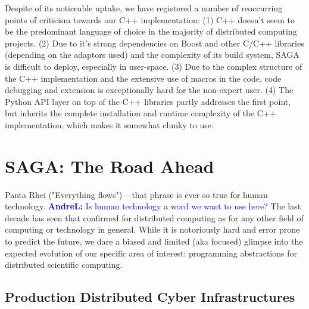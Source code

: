 \documentclass[]{article}
\newcommand{\B}[1]{\textbf{#1}}
\newcommand{\amnote}[1]{{\textcolor{green}{   \B{AndreM:  } #1 }}}
\newcommand{\alnote}[1]{{\textcolor{blue}{    \B{AndreL:  } #1 }}}
\newcommand{\amnote}[1]{}
\newcommand{\alnote}[1]{}
\begin{document}
   Despite of its noticeable uptake, we have registered a number of
   reoccurring points of criticism towards our C++ implementation:
   (1) C++ doesn't seem to be the predominant language of choice
   in the majority of distributed computing projects.
   (2) Due to it's strong dependencies on Boost and other C/C++
   libraries (depending on the adaptors used) and the complexity of its
   build system, SAGA is difficult to deploy, especially in user-space.
   (3) Due to the complex structure of the C++ implementation and the
   extensive use of macros in the code, code debugging and extension
   is exceptionally hard for the non-expert user.
   (4) The Python API layer on top of the C++ libraries partly
   addresses the first point, but inherits the complete installation and
   runtime complexity of the C++ implementation, which makes it somewhat
   clunky to use.




\section{SAGA: The Road Ahead}
\label{sec:road}

 Panta Rhei ("Everything flows") -- that phrase is ever so true for
 human technology.\alnote{Is human technology a word we want to use here?}  
 The last decade has seen that confirmed for
 distributed computing as for any other field of computing or
 technology in general.  While it is notoriously hard and error prone
 to predict the future, we dare a biased and limited (aka focused)
 glimpse into the expected evolution of our specific area of interest:
 programming abstractions for distributed scientific computing. 


 \subsection{Production Distributed Cyber Infrastructures}
\end{document}
